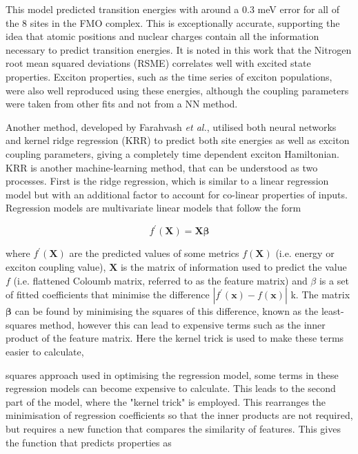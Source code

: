 This model predicted \Qy transition energies with around a 0.3 meV error for all
of the 8 sites in the FMO complex. This is exceptionally accurate, supporting the
idea that atomic positions and nuclear charges contain all the information necessary
to predict transition energies. It is noted in this work that the Nitrogen root
mean squared deviations (RSME) correlates well with excited state properties. Exciton
properties, such as the time series of exciton populations, were also well reproduced
using these \Qy energies, although the coupling parameters were taken from other
fits and not from a NN method.

Another method, developed by Farahvash \emph{et al.}, utilised both neural networks
and kernel ridge regression (KRR) to predict both site energies as well as exciton 
coupling parameters, giving a completely time dependent exciton Hamiltonian. KRR
is another machine-learning method, that can be understood as two processes. First
is the ridge regression, which is similar to a linear regression model but with
an additional factor to account for co-linear properties of inputs. Regression models
are multivariate linear models that follow the form

\begin{equation}
	f^\prime\left(\mathbf{X}\right) = \mathbf{X} \mathbf{\beta}
\end{equation}

where $f^\prime\left(\mathbf{X}\right)$ are the predicted values of some metrics $f\left(\mathbf{X}\right)$ 
(i.e. \Qy energy or exciton coupling value), $\mathbf{X}$ is the matrix of information
used to predict the value $f$ (i.e. flattened Coloumb matrix, referred to as the feature
matrix) and $\beta$ is a set of fitted coefficients that minimise the difference 
$\left\lvert f^\prime \left( \mathbf{x}\right) - f \left(\mathbf{x}\right)\right\rvert$ k.
The matrix $\mathbf{\beta}$ can be found by minimising the squares of this difference, 
known as the least-squares method, however this can lead to expensive terms such
as the inner product of the feature matrix. Here the kernel trick is used to make
these terms easier to calculate, 

squares approach used in optimising the regression model, some terms in these regression
models can become expensive to calculate. This leads to the second part of the model, 
where the "kernel trick" is employed. This rearranges the minimisation of regression
coefficients so that the inner products are not required, but requires a new function
that compares the similarity of features. This gives the function that predicts 
properties as 

